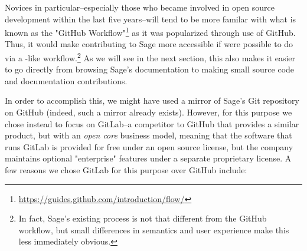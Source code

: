 Novices in particular--especially those who became involved in open source
development within the last five years--will tend to be more familar with what
is known as the "GitHub
Workflow"\footnote{\url{https://guides.github.com/introduction/flow/}} as it
was popularized through use of GitHub.  Thus, it would make contributing to
Sage more accessible if were possible to do via a \GitHub-like
workflow.\footnote{In fact, Sage's existing process is not that different from
the GitHub workflow, but small differences in semantics and user experience
make this less immediately obvious.}  As we will see in the next section, this
also makes it easier to go directly from browsing Sage's documentation to
making small source code and documentation contributions.

In order to accomplish this, we might have used a mirror of Sage's Git
repository on GitHub (indeed, such a mirror already exists).  However, for this
purpose we chose instead to focus on GitLab--a competitor to GitHub that
provides a similar product, but with an {\em open core} business model, meaning
that the software that runs GitLab is provided for free under an open source
license, but the company maintains optional "enterprise" features under a
separate proprietary license.  A few reasons we chose GitLab for this purpose
over GitHub include:

